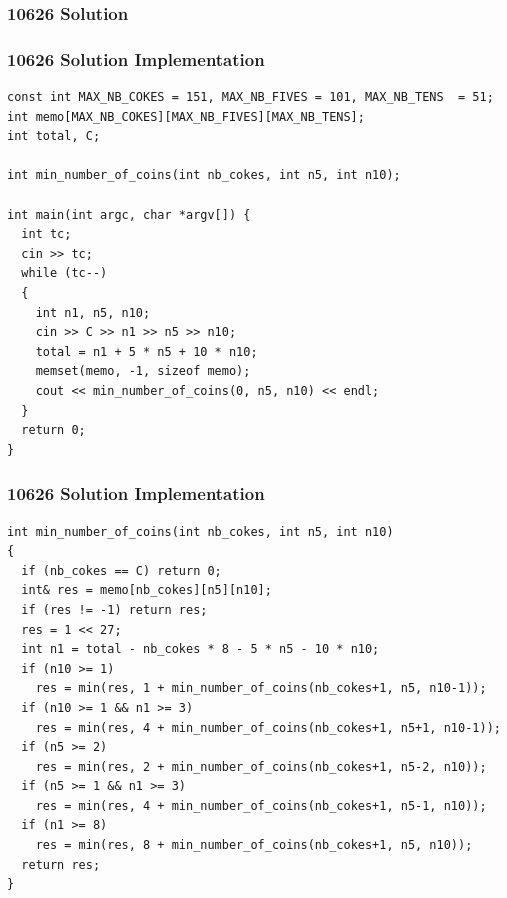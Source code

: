 \documentclass{beamer}
\newcommand{\uvalink}[2]{UVa Online Judge (http://uva.onlinejudge.org)
  problem number \href{#2}{\textcolor{blue}{#1}.}}
\newcounter{exo}
\newcommand{\exo}{
  \addtocounter{exo}{1}
  Exercice \arabic{exo}
}
\begin{document}
\ifanswers

\begin{frame}%
\frametitle{10626 Solution}

\end{frame}

\begin{frame}[fragile]
\frametitle{10626 Solution Implementation}

\scriptsize
\begin{lstlisting}
const int MAX_NB_COKES = 151, MAX_NB_FIVES = 101, MAX_NB_TENS  = 51;
int memo[MAX_NB_COKES][MAX_NB_FIVES][MAX_NB_TENS];
int total, C;

int min_number_of_coins(int nb_cokes, int n5, int n10);

int main(int argc, char *argv[]) {
  int tc;
  cin >> tc;
  while (tc--)
  {
    int n1, n5, n10;
    cin >> C >> n1 >> n5 >> n10;
    total = n1 + 5 * n5 + 10 * n10;
    memset(memo, -1, sizeof memo);
    cout << min_number_of_coins(0, n5, n10) << endl;
  }
  return 0;
}
\end{lstlisting}

\end{frame}

\begin{frame}[fragile]
\frametitle{10626 Solution Implementation}

\scriptsize
\begin{lstlisting}
int min_number_of_coins(int nb_cokes, int n5, int n10)
{
  if (nb_cokes == C) return 0;
  int& res = memo[nb_cokes][n5][n10];
  if (res != -1) return res;
  res = 1 << 27;
  int n1 = total - nb_cokes * 8 - 5 * n5 - 10 * n10;
  if (n10 >= 1)
    res = min(res, 1 + min_number_of_coins(nb_cokes+1, n5, n10-1));
  if (n10 >= 1 && n1 >= 3)
    res = min(res, 4 + min_number_of_coins(nb_cokes+1, n5+1, n10-1));
  if (n5 >= 2)
    res = min(res, 2 + min_number_of_coins(nb_cokes+1, n5-2, n10));
  if (n5 >= 1 && n1 >= 3)
    res = min(res, 4 + min_number_of_coins(nb_cokes+1, n5-1, n10));
  if (n1 >= 8)
    res = min(res, 8 + min_number_of_coins(nb_cokes+1, n5, n10));
  return res;
}
\end{lstlisting}

\end{frame}

\fi

\end{document}

